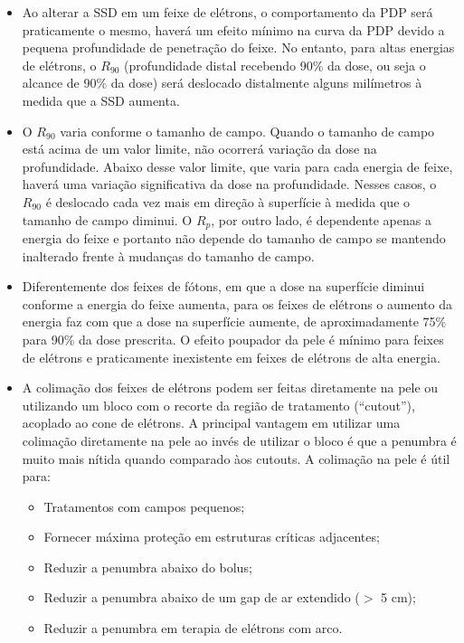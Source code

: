 \documentclass[11pt,a4paper]{article}
\newcounter{exemplo}
\begin{document}
\begin{exemplo}
\begin{itemize}
        \item Ao alterar a SSD em um feixe de elétrons, o comportamento da PDP será praticamente o mesmo, haverá um efeito mínimo na curva da PDP devido a pequena profundidade de penetração do feixe. No entanto, para altas energias de elétrons, o $R_{90}$ (profundidade distal recebendo 90\% da dose, ou seja o alcance de 90\% da dose) será deslocado distalmente alguns milímetros à medida que a SSD aumenta.
        
        \item O $R_{90}$ varia conforme o tamanho de campo. Quando o tamanho de campo está acima de um valor limite, não ocorrerá variação da dose na profundidade. Abaixo desse valor limite, que varia para cada energia de feixe, haverá uma variação significativa da dose na profundidade. Nesses casos, o $R_{90}$ é deslocado cada vez mais em direção à superfície à medida que o tamanho de campo diminui. O $R_p$, por outro lado, é dependente apenas a energia do feixe e portanto não depende do tamanho de campo se mantendo inalterado frente à mudanças do tamanho de campo.
    
        \item Diferentemente dos feixes de fótons, em que a dose na superfície diminui conforme a energia do feixe aumenta, para os feixes de elétrons o aumento da energia faz com que a dose na superfície aumente, de aproximadamente 75\% para 90\% da dose prescrita. O efeito poupador da pele é mínimo para feixes de elétrons e praticamente inexistente em feixes de elétrons de alta energia. 

        \item A colimação dos feixes de elétrons podem ser feitas diretamente na pele ou utilizando um bloco com o recorte da região de tratamento (``cutout''), acoplado ao cone de elétrons. A principal vantagem em utilizar uma colimação diretamente na pele ao invés de utilizar o bloco é que a penumbra é muito mais nítida quando comparado àos cutouts. A colimação na pele é útil para:
        
            \begin{itemize}[label=\textopenbullet]
                \item Tratamentos com campos pequenos;
                \item Fornecer máxima proteção em estruturas críticas adjacentes;
                \item Reduzir a penumbra abaixo do bolus;
                \item Reduzir a penumbra abaixo de um gap de ar extendido ($>$ 5 cm);
                \item Reduzir a penumbra em terapia de elétrons com arco. 
            \end{itemize}
        

\end{itemize}
\end{exemplo}
\end{document}
